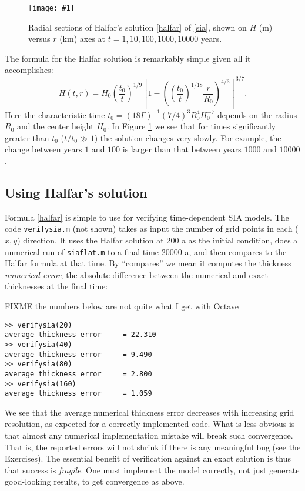 \documentclass[letterpaper,final,12pt,reqno]{amsart}
\newcommand{\onefigsize}[3]{
\begin{figure}[ht]
\centering
\texttt{[image: \#1]}
\caption{#2}
\label{fig:#1}
\end{figure}}
\begin{document}
\onefigsize{siascaling}{Radial sections of Halfar's solution \eqref{halfar} of \eqref{sia}, shown on $H$ (m) versus $r$ (km) axes at $t=1,10,100,1000,10000$ years.}{5.5in}

The formula for the Halfar solution is remarkably simple given all it accomplishes:
\begin{equation}
H(t,r) = H_0 \left(\frac{t_0}{t}\right)^{1/9} \left[1 - \left(\left(\frac{t_0}{t}\right)^{1/18} \frac{r}{R_0}\right)^{4/3}\right]^{3/7}. \label{halfar}
\end{equation}
Here the characteristic time $t_0 = (18 \Gamma)^{-1} (7/4)^3 R_0^4 H_0^{-7}$ depends on the radius $R_0$ and the center height $H_0$.  In Figure \ref{fig:siascaling} we see that for times significantly greater than $t_0$ ($t/t_0 \gg 1$) the solution changes very slowly.  For example, the change between years $1$ and $100$ is larger than that between years $1000$ and $10000$.

\subsection*{Using Halfar's solution}  Formula \eqref{halfar} is simple to use for verifying time-dependent SIA models.  The code \texttt{verifysia.m} (not shown) takes as input the number of grid points in each ($x,y$) direction.  It uses the Halfar solution at 200 a as the initial condition, does a numerical run of \texttt{siaflat.m} to a final time 20000 a, and then compares to the Halfar formula at that time.  By ``compares'' we mean it computes the thickness \emph{numerical error}, the absolute difference between the numerical and exact thicknesses at the final time:

FIXME the numbers below are not quite what I get with Octave

\small
\begin{verbatim}
>> verifysia(20)
average thickness error     = 22.310
>> verifysia(40)
average thickness error     = 9.490
>> verifysia(80)
average thickness error     = 2.800
>> verifysia(160)
average thickness error     = 1.059
\end{verbatim}
\normalsize
We see that the average numerical thickness error decreases with increasing grid resolution, as expected for a correctly-implemented code.  What is less obvious is that almost any numerical implementation mistake will break such convergence.  That is, the reported errors will not shrink if there is any meaningful bug (see the Exercises).  The essential benefit of verification against an exact solution is thus that success is \emph{fragile}.  One must implement the model correctly, not just generate good-looking results, to get convergence as above.
\end{document}
